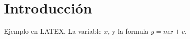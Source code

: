 \documentclass[a4paper. 12pt]{article}
\begin{document}
\section{Introducción}
  Ejemplo en LATEX. 
La variable $x$, y la formula \( y = m x + c \).
\end{document}
